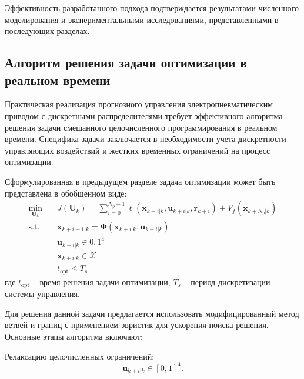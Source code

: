 Эффективность разработанного подхода подтверждается результатами численного моделирования и экспериментальными
исследованиями, представленными в последующих разделах.

\subsection{Алгоритм решения задачи оптимизации в реальном времени}\label{subsec:ch3/sec5/sub4}

Практическая реализация прогнозного управления электропневматическим
приводом с дискретными распределителями требует эффективного алгоритма
решения задачи смешанного целочисленного программирования в реальном времени.
Специфика задачи заключается в необходимости учета дискретности управляющих воздействий и
жестких временных ограничений на процесс оптимизации.

Сформулированная в предыдущем разделе задача оптимизации может быть представлена в обобщенном виде:
\begin{equation}
	\begin{aligned}
		\min_{\mathbf{U}_k} \quad & J(\mathbf{U}_k) = \sum_{i=0}^{N_p-1} \ell(\mathbf{x}_{k+i|k}, \mathbf{u}_{k+i|k}, \mathbf{r}_{k+i}) + V_f(\mathbf{x}_{k+N_p|k}) \\
		\text{s.t.} \quad         & \mathbf{x}_{k+i+1|k} = \boldsymbol{\Phi}(\mathbf{x}_{k+i|k}, \mathbf{u}_{k+i|k})                                                \\
		                          & \mathbf{u}_{k+i|k} \in {0,1}^4                                                                                                  \\
		                          & \mathbf{x}_{k+i|k} \in \mathcal{X}                                                                                              \\
		                          & t_{\text{opt}} \leq T_s
	\end{aligned}
\end{equation}
где $t_{\text{opt}}$ -- время решения задачи оптимизации;
$T_s$ -- период дискретизации системы управления.

Для решения данной задачи предлагается использовать модифицированный метод ветвей
и границ с применением эвристик для ускорения поиска решения. Основные этапы алгоритма включают:

Релаксацию целочисленных ограничений:
\begin{equation}
	\mathbf{u}_{k+i|k} \in [0,1]^4.
\end{equation}

